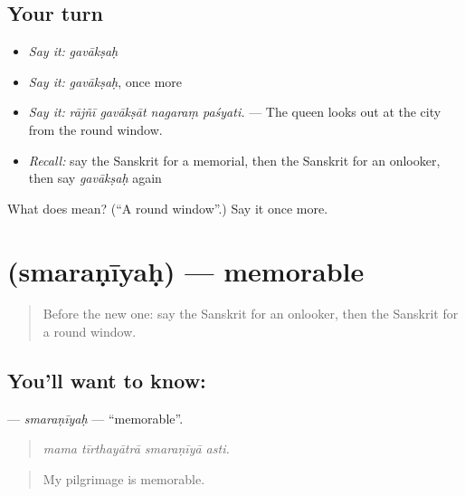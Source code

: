 \subsection*{Your turn}
\begin{itemize}
\raggedright
  \item \emph{Say it:} \emph{gavākṣaḥ}
  \item \emph{Say it:} \emph{gavākṣaḥ}, once more
  \item \emph{Say it:} \emph{rājñī gavākṣāt nagaraṃ paśyati.} — The queen looks out at the city from the round window.
  \item \emph{Recall:} say the Sanskrit for a memorial, then the Sanskrit for an onlooker, then say \emph{gavākṣaḥ} again
\end{itemize}

\begin{tcolorbox}[breakable,colback=teal!4,colframe=teal!35!black,title={Before you move on}]
What does  mean? (\textquotedblleft{}A round window\textquotedblright{}.) Say it once more.
\end{tcolorbox}
\section[\texorpdfstring{\sk{स्मरणीयः} (smaraṇīyaḥ)}{स्मरणीयः (smaraṇīyaḥ)}]{ (smaraṇīyaḥ) — memorable}

\label{lesson:SA-C425-smaraniyah}



\begin{quote}
Before the new one: say the Sanskrit for an onlooker, then the Sanskrit for a round window.
\end{quote}

\subsection*{You'll want to know: }
\textbf{} — \emph{smaraṇīyaḥ} — \textquotedblleft{}memorable\textquotedblright{}.

\begin{quote}
   
\end{quote}

\begin{quote}
\emph{mama tīrthayātrā smaraṇīyā asti.}
\end{quote}

\begin{quote}
My pilgrimage is memorable.
\end{quote}

